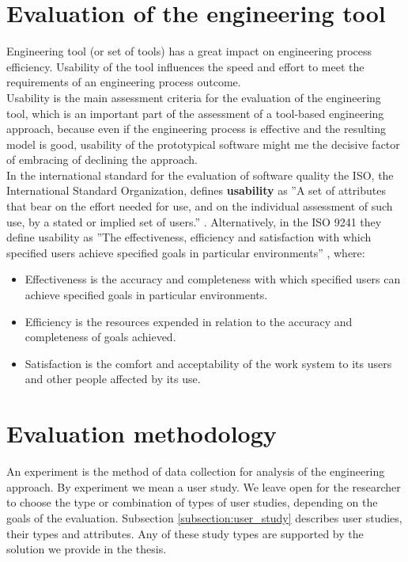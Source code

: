 \section{Evaluation of the engineering tool}\label{section:eval_p_t}

Engineering tool (or set of tools) has a great impact on engineering process efficiency. Usability of the tool influences the speed and effort to meet the requirements of an engineering process outcome.\\

Usability is the main assessment criteria for the evaluation of the engineering tool, which is an important part of the assessment of a tool-based engineering approach, because even if the engineering process is effective and the resulting model is good, usability of the prototypical software might me the decisive factor of embracing of declining the approach.\\

In the international standard for the evaluation of software quality the  ISO, the International Standard Organization, defines \textbf{usability} as ”A set of attributes that bear on
the effort needed for use, and on the individual assessment of such use, by a stated or implied set of users.” \cite{iso2001}. Alternatively, in the ISO 9241 they define usability as ”The effectiveness, 
efficiency and satisfaction with which specified users achieve specified goals in particular environments” \cite{iso2010}, where:
\begin{itemize}
\item  Effectiveness is the accuracy and completeness with which specified users can achieve specified goals in particular environments.
\item  Efficiency is the resources expended in relation to the accuracy and completeness of goals achieved.
\item  Satisfaction is the comfort and acceptability of the work system to its users and other people affected by its use.
\end{itemize}

\section{Evaluation methodology}\label{section:eval_methodology}

An experiment is the method of data collection for analysis of the engineering approach. By experiment we mean a user study. We leave open for the researcher to choose the type or combination of types of user studies, depending on the goals of the evaluation.  Subsection \ref{subsection:user_study} describes user studies, their types and attributes. Any of these study types are supported by the solution we provide in the thesis.\\

